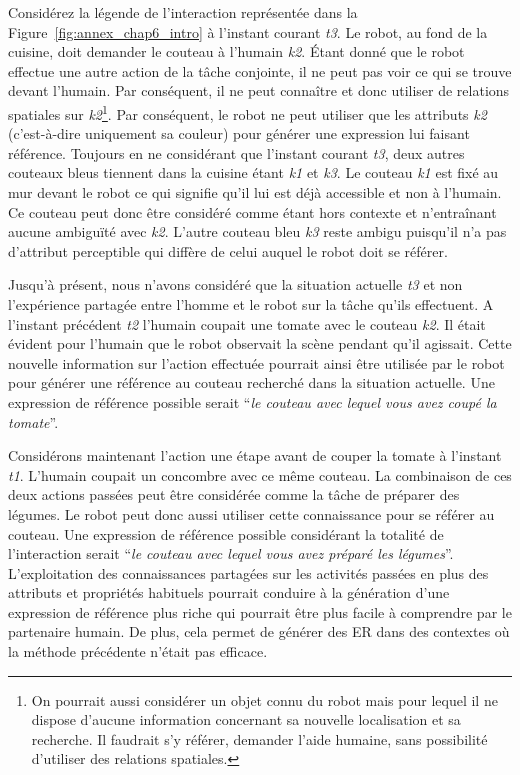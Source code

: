 Considérez la légende de l'interaction représentée dans la Figure~\ref{fig:annex_chap6_intro} à l'instant courant \textit{t3}. Le robot, au fond de la cuisine, doit demander le couteau à l'humain \textit{k2}. Étant donné que le robot effectue une autre action de la tâche conjointe, il ne peut pas voir ce qui se trouve devant l'humain. Par conséquent, il ne peut connaître et donc utiliser de relations spatiales sur \textit{k2}\footnote{On pourrait aussi considérer un objet connu du robot mais pour lequel il ne dispose d'aucune information concernant sa nouvelle localisation et sa recherche. Il faudrait s'y référer, demander l'aide humaine, sans possibilité d'utiliser des relations spatiales.}. Par conséquent, le robot ne peut utiliser que les attributs \textit{k2} (c'est-à-dire uniquement sa couleur) pour générer une expression lui faisant référence. Toujours en ne considérant que l'instant courant \textit{t3}, deux autres couteaux bleus tiennent dans la cuisine étant \textit{k1} et \textit{k3}. Le couteau \textit{k1} est fixé au mur devant le robot ce qui signifie qu'il lui est déjà accessible et non à l'humain. Ce couteau peut donc être considéré comme étant hors contexte et n'entraînant aucune ambiguïté avec \textit{k2}. L'autre couteau bleu \textit{k3} reste ambigu puisqu'il n'a pas d'attribut perceptible qui diffère de celui auquel le robot doit se référer.

Jusqu'à présent, nous n'avons considéré que la situation actuelle \textit{t3} et non l'expérience partagée entre l'homme et le robot sur la tâche qu'ils effectuent. A l'instant précédent \textit{t2} l'humain coupait une tomate avec le couteau \textit{k2}. Il était évident pour l'humain que le robot observait la scène pendant qu'il agissait. Cette nouvelle information sur l'action effectuée pourrait ainsi être utilisée par le robot pour générer une référence au couteau recherché dans la situation actuelle. Une expression de référence possible serait ``\textit{le couteau avec lequel vous avez coupé la tomate}''.

Considérons maintenant l'action une étape avant de couper la tomate à l'instant \textit{t1}. L'humain coupait un concombre avec ce même couteau. La combinaison de ces deux actions passées peut être considérée comme la tâche de préparer des légumes. Le robot peut donc aussi utiliser cette connaissance pour se référer au couteau. Une expression de référence possible considérant la totalité de l'interaction serait ``\textit{le couteau avec lequel vous avez préparé les légumes}''. L'exploitation des connaissances partagées sur les activités passées en plus des attributs et propriétés habituels pourrait conduire à la génération d'une expression de référence plus riche qui pourrait être plus facile à comprendre par le partenaire humain. De plus, cela permet de générer des ER dans des contextes où la méthode précédente n'était pas efficace.

